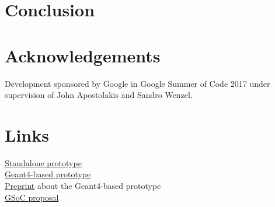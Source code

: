 \documentclass[a4paper, 12pt]{article} %
\begin{document}
 \section*{ Conclusion }
 
 \section*{ Acknowledgements }
  Development sponsored by Google in Google Summer of Code 2017 under supervision of John Apostolakis and Sandro Wenzel.
 
 \section*{ Links }
 
  \href{https://bitbucket.org/sd57/pedigree-git}{Standalone prototype}\\
  \href{https://bitbucket.org/sd57/geant4/branch/pedigree}{Geant4-based prototype}\\
  \href{https://sd57.github.io/g4dprng/gsocPreprint.html}{Preprint} about the Geant4-based prototype\\
  \href{https://sd57.github.io/g4dprng/gsoc-proposal-Savin.html}{GSoC proposal}\\
  
%  
%  
 
\end{document}
